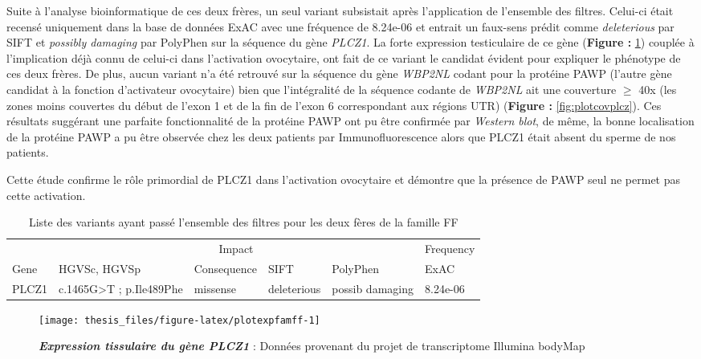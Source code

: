\documentclass[12pt,twoside]{ugathesis}
\begin{document}
Suite à l'analyse bioinformatique de ces deux frères, un seul variant
subsistait après l'application de l'ensemble des filtres. Celui-ci était
recensé uniquement dans la base de données ExAC avec une fréquence de
8.24e-06 et entrait un faux-sens prédit comme \emph{deleterious} par
SIFT et \emph{possibly damaging} par PolyPhen sur la séquence du gène
\emph{PLCZ1}. La forte expression testiculaire de ce gène
(\textbf{Figure : }\ref{fig:plotexpfamff}) couplée à l'implication déjà
connu de celui-ci dans l'activation ovocytaire, ont fait de ce variant
le candidat évident pour expliquer le phénotype de ces deux frères. De
plus, aucun variant n'a été retrouvé sur la séquence du gène
\emph{WBP2NL} codant pour la protéine PAWP (l'autre gène candidat à la
fonction d'activateur ovocytaire) bien que l'intégralité de la séquence
codante de \emph{WBP2NL} ait une couverture \(\ge\) 40x (les zones moins
couvertes du début de l'exon 1 et de la fin de l'exon 6 correspondant
aux régions UTR) (\textbf{Figure : }\ref{fig:plotcovplcz}). Ces
résultats suggérant une parfaite fonctionnalité de la protéine PAWP ont
pu être confirmée par \emph{Western blot}, de même, la bonne
localisation de la protéine PAWP a pu être observée chez les deux
patients par Immunofluorescence alors que PLCZ1 était absent du sperme
de nos patients.

Cette étude confirme le rôle primordial de PLCZ1 dans l'activation
ovocytaire et démontre que la présence de PAWP seul ne permet pas cette
activation.

\begin{longtable}[t]{llllll}
\caption{\label{tab:tabrecapff}Liste des variants ayant passé l'ensemble des filtres pour les deux fères de la famille FF}\\
\toprule
\multicolumn{1}{c}{ } & \multicolumn{4}{c}{Impact} & \multicolumn{1}{c}{Frequency} \\
\cmidrule(l{2pt}r{2pt}){2-5} \cmidrule(l{2pt}r{2pt}){6-6}
Gene & HGVSc, HGVSp & Consequence & SIFT & PolyPhen & ExAC\\
\midrule
PLCZ1 & c.1465G>T ; p.Ile489Phe & missense & deleterious & possib damaging & 8.24e-06\\
\bottomrule
\end{longtable}

\newpage

\begin{figure}

{\centering \texttt{[image: thesis\_files/figure-latex/plotexpfamff-1]} 

}

\caption[Expression tissulaire du gène PLCZ1]{\textbf{\emph{Expression tissulaire du gène
\emph{PLCZ1}}} : Données provenant du projet de transcriptome Illumina
bodyMap}\label{fig:plotexpfamff}
\end{figure}
\end{document}

